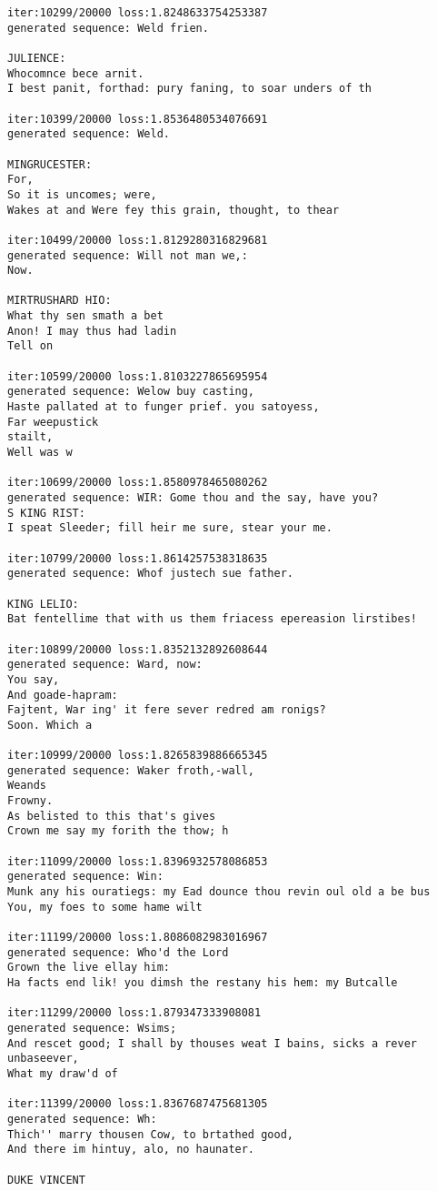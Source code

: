\documentclass[11pt]{article}
\begin{document}
\begin{Verbatim}[commandchars=\\\{\}]
iter:10299/20000 loss:1.8248633754253387
generated sequence: Weld frien.

JULIENCE:
Whocomnce bece arnit.
I best panit, forthad: pury faning, to soar unders of th

iter:10399/20000 loss:1.8536480534076691
generated sequence: Weld.

MINGRUCESTER:
For,
So it is uncomes; were,
Wakes at and Were fey this grain, thought, to thear

iter:10499/20000 loss:1.8129280316829681
generated sequence: Will not man we,:
Now.

MIRTRUSHARD HIO:
What thy sen smath a bet
Anon! I may thus had ladin
Tell on 

iter:10599/20000 loss:1.8103227865695954
generated sequence: Welow buy casting,
Haste pallated at to funger prief. you satoyess,
Far weepustick
stailt,
Well was w

iter:10699/20000 loss:1.8580978465080262
generated sequence: WIR: Gome thou and the say, have you?
S KING RIST:
I speat Sleeder; fill heir me sure, stear your me.

iter:10799/20000 loss:1.8614257538318635
generated sequence: Whof justech sue father.

KING LELIO:
Bat fentellime that with us them friacess epereasion lirstibes!

iter:10899/20000 loss:1.8352132892608644
generated sequence: Ward, now:
You say,
And goade-hapram:
Fajtent, War ing' it fere sever redred am ronigs?
Soon. Which a

iter:10999/20000 loss:1.8265839886665345
generated sequence: Waker froth,-wall,
Weands
Frowny.
As belisted to this that's gives
Crown me say my forith the thow; h

iter:11099/20000 loss:1.8396932578086853
generated sequence: Win:
Munk any his ouratiegs: my Ead dounce thou revin oul old a be bus
You, my foes to some hame wilt

iter:11199/20000 loss:1.8086082983016967
generated sequence: Who'd the Lord
Grown the live ellay him:
Ha facts end lik! you dimsh the restany his hem: my Butcalle

iter:11299/20000 loss:1.879347333908081
generated sequence: Wsims;
And rescet good; I shall by thouses weat I bains, sicks a rever unbaseever,
What my draw'd of 

iter:11399/20000 loss:1.8367687475681305
generated sequence: Wh:
Thich'' marry thousen Cow, to brtathed good,
And there im hintuy, alo, no haunater.

DUKE VINCENT


\end{Verbatim}
\end{document}

